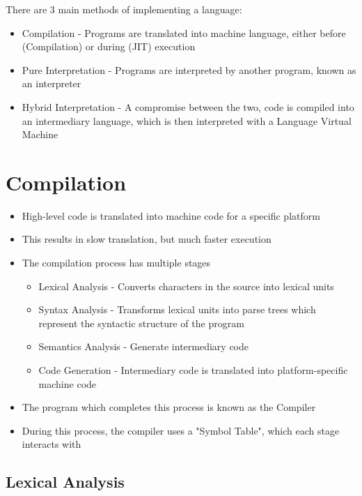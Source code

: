 
There are 3 main methods of implementing a language:
\begin{itemize}
  \item Compilation - Programs are translated into machine language, either before (Compilation) or during (JIT)
   execution
  \item Pure Interpretation - Programs are interpreted by another program, known as an interpreter
  \item Hybrid Interpretation - A compromise between the two, code is compiled into an intermediary language, which is
   then interpreted with a Language Virtual Machine
\end{itemize}

\section*{Compilation}

\begin{itemize}
  \item High-level code is translated into machine code for a specific platform
  \item This results in slow translation, but much faster execution
  \item The compilation process has multiple stages
  \begin{itemize}
    \item Lexical Analysis - Converts characters in the source into lexical units
    \item Syntax Analysis - Transforms lexical units into parse trees which represent the syntactic structure of the
     program
    \item Semantics Analysis - Generate intermediary code
    \item Code Generation - Intermediary code is translated into platform-specific machine code
  \end{itemize}
  \item The program which completes this process is known as the Compiler
  \item During this process, the compiler uses a "Symbol Table", which each stage interacts with
\end{itemize}

\subsection*{Lexical Analysis}

